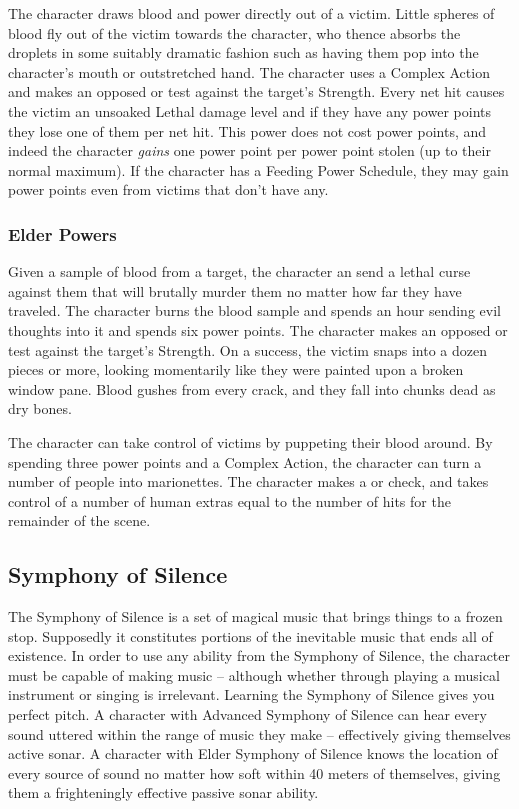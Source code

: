 The character draws blood and power directly out of a victim. Little spheres of blood fly out of the victim towards the character, who thence absorbs the droplets in some suitably dramatic fashion such as having them pop into the character's mouth or outstretched hand. The character uses a Complex Action and makes an opposed  or  test against the target's Strength. Every net hit causes the victim an unsoaked Lethal damage level and if they have any power points they lose one of them per net hit. This power does not cost power points, and indeed the character \textit{gains} one power point per power point stolen (up to their normal maximum). If the character has a Feeding Power Schedule, they may gain power points even from victims that don't have any.

\subsubsection{Elder Powers}

 Given a sample of blood from a target, the character an send a lethal curse against them that will brutally murder them no matter how far they have traveled. The character burns the blood sample and spends an hour sending evil thoughts into it and spends six power points. The character makes an opposed  or  test against the target's Strength. On a success, the victim snaps into a dozen pieces or more, looking momentarily like they were painted upon a broken window pane. Blood gushes from every crack, and they fall into chunks dead as dry bones.

 The character can take control of victims by puppeting their blood around. By spending three power points and a Complex Action, the character can turn a number of people into marionettes. The character makes a  or  check, and takes control of a number of human extras equal to the number of hits for the remainder of the scene.


\subsection{Symphony of Silence}

The Symphony of Silence is a set of magical music that brings things to a frozen stop. Supposedly it constitutes portions of the inevitable music that ends all of existence. In order to use any ability from the Symphony of Silence, the character must be capable of making music -- although whether through playing a musical instrument or singing is irrelevant. Learning the Symphony of Silence gives you perfect pitch. A character with Advanced Symphony of Silence can hear every sound uttered within the range of music they make -- effectively giving themselves active sonar. A character with Elder Symphony of Silence knows the location of every source of sound no matter how soft within 40 meters of themselves, giving them a frighteningly effective passive sonar ability.

